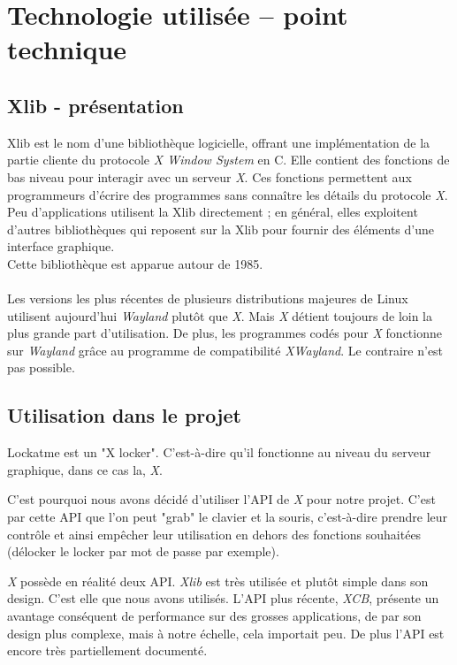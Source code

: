 \documentclass[french]{report}
\begin{document}
\section{Technologie utilisée – point technique}

\subsection{Xlib - présentation}

Xlib est le nom d'une bibliothèque logicielle, offrant une implémentation de la
partie cliente du protocole \emph{X Window System} en C. Elle contient des fonctions
de bas niveau pour interagir avec un serveur \emph{X}. Ces fonctions permettent aux
programmeurs d'écrire des programmes sans connaître les détails du protocole \emph{X}.
Peu d'applications utilisent la Xlib directement ; en général, elles exploitent
d'autres bibliothèques qui reposent sur la Xlib pour fournir des éléments
d'une interface graphique.\\
Cette bibliothèque est apparue autour de 1985.\\\\
Les versions les plus récentes de plusieurs distributions majeures de Linux utilisent
aujourd'hui \emph{Wayland} plutôt que \emph{X}. Mais \emph{X} détient toujours de loin la plus
grande part d'utilisation. De plus, les programmes codés pour \emph{X} fonctionne
sur \emph{Wayland} grâce au programme de compatibilité \emph{XWayland}. Le contraire n'est pas
possible.

\subsection{Utilisation dans le projet}

Lockatme est un "X locker". C'est-à-dire qu'il fonctionne au niveau du serveur graphique,
dans ce cas la, \emph{X}.

C'est pourquoi nous avons décidé d'utiliser l'API de \emph{X} pour notre projet. C'est par
cette API que l'on peut "grab" le clavier et la souris, c'est-à-dire prendre leur contrôle
et ainsi empêcher leur utilisation en dehors des fonctions souhaitées (délocker le
locker par mot de passe par exemple).

\emph{X} possède en réalité deux API. \emph{Xlib} est très utilisée et plutôt
simple dans son design.
C'est elle que nous avons utilisés. L'API plus récente, \emph{XCB}, présente un
avantage conséquent de performance sur des grosses applications, de par son design
plus complexe, mais à notre échelle, cela importait peu. De plus l'API est encore
très partiellement documenté.
\end{document}
